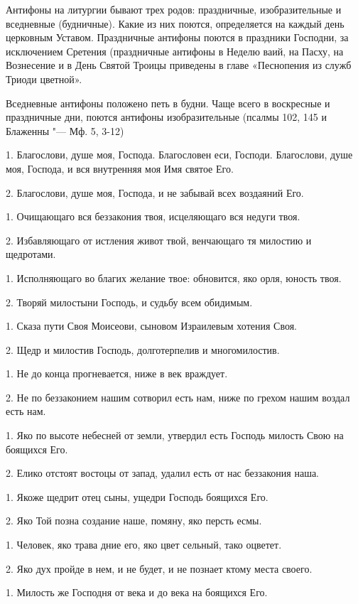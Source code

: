  Антифоны на литургии бывают трех родов: праздничные, изобразительные и вседневные (будничные). Какие из них поются, определяется на каждый день церковным Уставом. Праздничные антифоны поются в праздники Господни, за исключением Сретения (праздничные антифоны в Неделю ваий, на Пасху, на Вознесение и в День Святой Троицы приведены в главе «Песнопения из служб Триоди цветной».

 Вседневные антифоны положено петь в будни. Чаще всего в воскресные и праздничные дни, поются антифоны изобразительные (псалмы 102, 145 и Блаженны "--- Мф. 5, 3-12) 


 1. Благослови, душе моя, Господа. Благословен еси, Господи. Благослови, душе моя, Господа, и вся внутренняя моя Имя святое Его. 

 2. Благослови, душе моя, Господа, и не забывай всех воздаяний Его. 

 1. Очищающаго вся беззакония твоя,  исцеляющаго вся недуги твоя. 

 2. Избавляющаго от истления живот твой,  венчающаго тя милостию и щедротами. 

 1. Исполняющаго во благих желание твое:  обновится, яко орля, юность твоя. 

 2. Творяй милостыни Господь, и судьбу всем обидимым. 

 1. Сказа пути Своя Моисеови, сыновом Израилевым хотения Своя. 

 2. Щедр и милостив Господь, долготерпелив и многомилостив.

 1. Не до конца прогневается, ниже в век враждует. 

 2. Не по беззаконием нашим сотворил есть нам, ниже по грехом нашим воздал есть нам. 

 1. Яко по высоте небесней от земли,  утвердил есть Господь милость Свою на боящихся Его. 

 2. Елико отстоят востоцы от запад,  удалил есть от нас беззакония наша. 

 1. Якоже щедрит отец сыны, ущедри Господь боящихся Его. 

 2. Яко Той позна создание наше, помяну, яко персть есмы. 

 1. Человек, яко трава дние его, яко цвет сельный, тако оцветет. 

 2. Яко дух пройде в нем, и не будет, и не познает ктому места своего. 

 1. Милость же Господня от века и до века на боящихся Его. 

